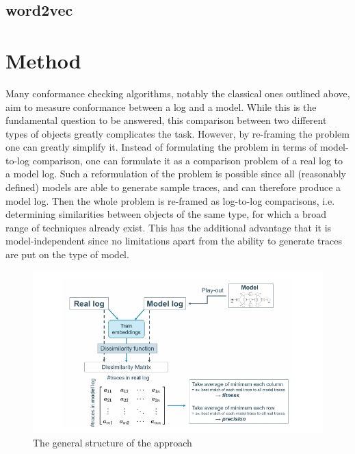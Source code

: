 \documentclass[runningheads]{template/llncs}
\begin{document}
\subsection{word2vec}

\section{Method}
\label{sec:method}
Many conformance checking algorithms, notably the classical ones outlined above, aim to measure conformance between a log and a model.
While this is the fundamental question to be answered, this comparison between two different types of objects greatly complicates the task.
However, by re-framing the problem one can greatly simplify it.
Instead of formulating the problem in terms of model-to-log comparison, one can formulate it as a comparison problem of a real log to a model log.
Such a reformulation of the problem is possible since all (reasonably defined) models are able to generate sample traces, and can therefore produce a model log.
Then the whole problem is re-framed as log-to-log comparisons, i.e. determining similarities between objects of the same type, for which a broad range of techniques already exist.
This has the additional advantage that it is model-independent since no limitations apart from the ability to generate traces are put on the type of model.
\begin{figure}
	\includegraphics[width=1\textwidth]{figures/structure}
	\caption{The general structure of the approach}
	\label{fig:structure}
\end{figure}
\end{document}
